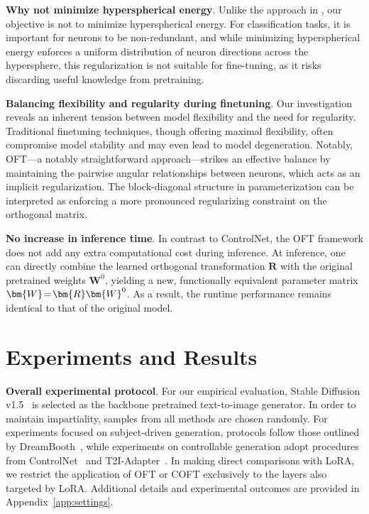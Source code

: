 \textbf{Why not minimize hyperspherical energy}. Unlike the approach in \cite{liu2021orthogonal}, our objective is not to minimize hyperspherical energy. For classification tasks, it is important for neurons to be non-redundant, and while minimizing hyperspherical energy enforces a uniform distribution of neuron directions across the hypersphere, this regularization is not suitable for fine-tuning, as it risks discarding useful knowledge from pretraining.

\textbf{Balancing flexibility and regularity during finetuning}. Our investigation reveals an inherent tension between model flexibility and the need for regularity. Traditional finetuning techniques, though offering maximal flexibility, often compromise model stability and may even lead to model degeneration. Notably, OFT—a notably straightforward approach—strikes an effective balance by maintaining the pairwise angular relationships between neurons, which acts as an implicit regularization. The block-diagonal structure in parameterization can be interpreted as enforcing a more pronounced regularizing constraint on the orthogonal matrix.

\textbf{No increase in inference time}. In contrast to ControlNet, the OFT framework does not add any extra computational cost during inference. At inference, one can directly combine the learned orthogonal transformation $\bm{R}$ with the original pretrained weights $\bm{W}^0$, yielding a new, functionally equivalent parameter matrix $\thickmuskip=2mu \medmuskip=2mu \bm{W}=\bm{R}\bm{W}^0$. As a result, the runtime performance remains identical to that of the original model.

\section{Experiments and Results}

\textbf{Overall experimental protocol}. For our empirical evaluation, Stable Diffusion v1.5~\cite{rombach2022high} is selected as the backbone pretrained text-to-image generator. In order to maintain impartiality, samples from all methods are chosen randomly. For experiments focused on subject-driven generation, protocols follow those outlined by DreamBooth~\cite{ruiz2023dreambooth}, while experiments on controllable generation adopt procedures from ControlNet~\cite{zhang2023adding} and T2I-Adapter~\cite{mou2023t2i}. In making direct comparisons with LoRA, we restrict the application of OFT or COFT exclusively to the layers also targeted by LoRA. Additional details and experimental outcomes are provided in Appendix~\ref{app:settings}.

